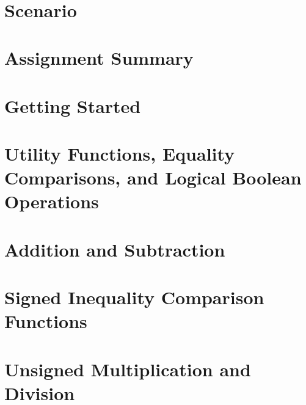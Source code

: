 \documentclass[12pt]{article}
\begin{document}
    \labidentifier\


    \softwareengineeringfrontmatter

    \section*{Scenario}                                                             \scenariointroduction

    \section{Assignment Summary}                                                    

    \section{Getting Started}                                                       

    \section{Utility Functions, Equality Comparisons, and Logical Boolean Operations}\label{sec:utility}
                                                                                    

    \section{Addition and Subtraction}                                              

    \section{Signed Inequality Comparison Functions}\label{sec:inequality-comparison}
                                                                                    

    \section{Unsigned Multiplication and Division}                                  
\end{document}
